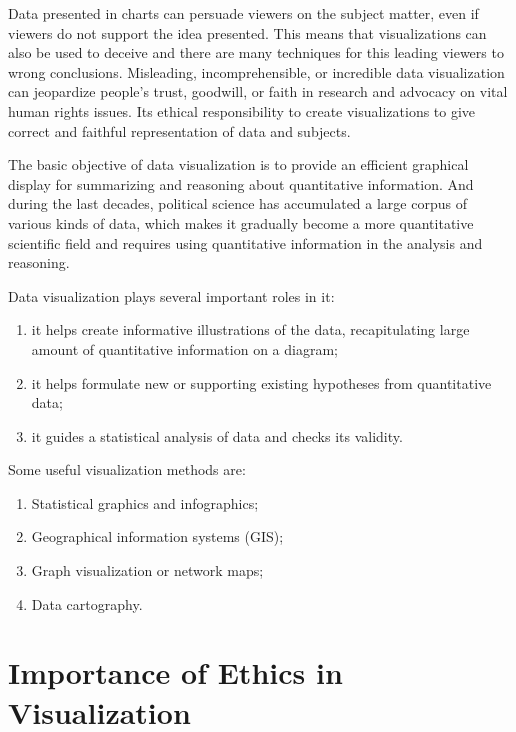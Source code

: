 \documentclass[]{book}
\providecommand{\tightlist}{%
  \setlength{\itemsep}{0pt}\setlength{\parskip}{0pt}}
\theoremstyle{definition}
\theoremstyle{definition}
\theoremstyle{definition}
\theoremstyle{remark}
\begin{document}
Data presented in charts can persuade viewers on the subject matter,
even if viewers do not support the idea presented. This means that
visualizations can also be used to deceive and there are many techniques
for this leading viewers to wrong conclusions. Misleading,
incomprehensible, or incredible data visualization can jeopardize
people's trust, goodwill, or faith in research and advocacy on vital
human rights issues. Its ethical responsibility to create visualizations
to give correct and faithful representation of data and subjects.

The basic objective of data visualization is to provide an efficient
graphical display for summarizing and reasoning about quantitative
information. And during the last decades, political science has
accumulated a large corpus of various kinds of data, which makes it
gradually become a more quantitative scientific field and requires using
quantitative information in the analysis and reasoning.

Data visualization plays several important roles in it:

\begin{enumerate}
\def\labelenumi{\arabic{enumi}.}
\tightlist
\item
  it helps create informative illustrations of the data, recapitulating
  large amount of quantitative information on a diagram;
\item
  it helps formulate new or supporting existing hypotheses from
  quantitative data;
\item
  it guides a statistical analysis of data and checks its validity.
\end{enumerate}

Some useful visualization methods are:

\begin{enumerate}
\def\labelenumi{\arabic{enumi}.}
\tightlist
\item
  Statistical graphics and infographics;
\item
  Geographical information systems (GIS);
\item
  Graph visualization or network maps;
\item
  Data cartography.
\end{enumerate}

\section{Importance of Ethics in
Visualization}\label{importance-of-ethics-in-visualization}
\end{document}
